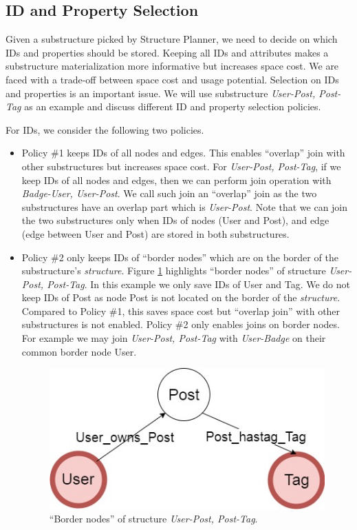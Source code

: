 \subsection{ID and Property Selection}

Given a substructure picked by Structure Planner, we need to decide on which IDs and properties should be stored. Keeping all IDs and attributes makes a substructure materialization more informative but increases space cost. We are faced with a trade-off between space cost and usage potential. Selection on IDs and properties is an important issue. We will use substructure \textit{User-Post, Post-Tag} as an example and discuss different ID and property selection policies.

For IDs, we consider the following two policies.

\begin{itemize}
\item Policy \#1 keeps IDs of all nodes and edges. This enables ``overlap'' join with other substructures but increases space cost. For \textit{User-Post, Post-Tag}, if we keep IDs of all nodes and edges, then we can perform join operation with \textit{Badge-User, User-Post}. We call such join an ``overlap'' join as the two substructures have an overlap part which is \textit{User-Post}. Note that we can join the two substructures only when IDs of nodes (User and Post), and edge (edge between User and Post) are stored in both substructures.

\item Policy \#2 only keeps IDs of ``border nodes'' which are on the border of the substructure's \textit{structure}. Figure \ref{border node} highlights ``border nodes'' of structure \textit{User-Post, Post-Tag}. In this example we only save IDs of User and Tag. We do not keep IDs of Post as node Post is not located on the border of the \textit{structure}. Compared to Policy \#1, this saves space cost but ``overlap join'' with other substructures is not enabled. Policy \#2 only enables joins on border nodes. For example we may join \textit{User-Post, Post-Tag} with \textit{User-Badge} on their common border node User.

\begin{figure}[H]
\centering
\includegraphics[scale=0.7]{pic/bordernode.jpg}
\caption{``Border nodes'' of structure \textit{User-Post, Post-Tag}.}
\label{border node}
\end{figure}
\end{itemize}


